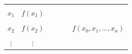 \begin{table}[h!]
{\begin{tabular}{c|c|c|c|c|c|}
					\multicolumn{1}{|c|}{}         &                       &                                                                                                                                                        &                                                                                                                                          &                                                                                       &                            \\
					\multicolumn{1}{|c|}{$x_1$}    & $f(x_1)$              &                                                                                                                                                        &                                                                                                                                          &                                                                                       &                            \\
					\multicolumn{1}{|c|}{}         &                       &                                                                                                                                                        &                                                                                                                                          &                                                                                       &                            \\
					\multicolumn{1}{|c|}{$x_2$}    & $f(x_2)$              &                                                                                                                                                        &                                                                                                                                          &                                                                                       & $f(x_0, x_1, \ldots, x_n)$ \\
					\multicolumn{1}{|l|}{}         & \multicolumn{1}{l|}{} &                                                                                                                                                        &                                                                                                                                          &                                                                                       & \multicolumn{1}{l|}{}      \\
					\multicolumn{1}{|c|}{$\vdots$} & $\vdots$              &                                                                                                                                                        &                                                                                                                                          &                                                                                       &                            \\

\end{tabular}}
\end{table}
